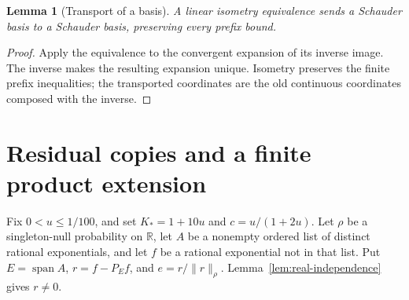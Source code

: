 \documentclass[reqno,a4paper,12pt]{amsart}
\newtheorem{lemma}[theorem]{Lemma}
\theoremstyle{definition}
\newcommand{\R}{\mathbb R}
\newcommand{\spn}{\operatorname{span}}
\begin{document}
\begin{lemma}[Transport of a basis]\label{lem:basis-transport}
A linear isometry equivalence sends a Schauder basis to a Schauder
basis, preserving every prefix bound.
\end{lemma}
\begin{proof}
Apply the equivalence to the convergent expansion of its inverse image.
The inverse makes the resulting expansion unique. Isometry preserves
the finite prefix inequalities; the transported coordinates are the
old continuous coordinates composed with the inverse.
\end{proof}

\section{Residual copies and a finite product extension}
Fix $0<u\le1/100$, and set
$K_*=1+10u$ and $c=u/(1+2u)$.
Let $\rho$ be a singleton-null probability on $\R$, let $A$ be a
nonempty ordered list of distinct rational exponentials, and let $f$
be a rational exponential not in that list. Put
$E=\spn A$, $r=f-P_Ef$, and $e=r/\|r\|_\rho$.
Lemma~\ref{lem:real-independence} gives $r\ne0$.
\end{document}
